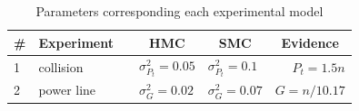 \documentclass[letterpaper]{article}
\newcommand{\tuple}[1] {\langle #1 \rangle}
\newcommand{\bvec}[1]{\textbf{#1}}
\begin{document}
%

\begin{table}[t]
\footnotesize
\caption{Parameters corresponding each experimental model}
\label{t:parameters}
\centering
\begin{tabular}{l l c l l r}
\toprule
\# &\multicolumn{1}{c}{Experiment}  &\multicolumn{1}{c}{} &\multicolumn{1}{c}{HMC} &\multicolumn{1}{c}{SMC} &\multicolumn{1}{c}{Evidence}\\
\midrule
1 & collision 		&      & $\sigma^2_{P_t} = 0.05$ & $\sigma^2_{P_t} = 0.1$ & $P_t = 1.5n$\\
2 & power line		&      & $\sigma^2_{G} = 0.02$    &$\sigma^2_{G} = 0.07$   & $G = n/10.17$ \\
\bottomrule
\end{tabular}
\end{table}
\end{document}
